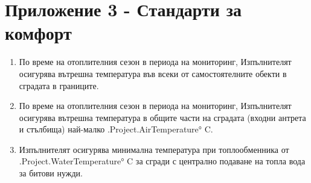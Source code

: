 \section{Приложение 3 {-} Стандарти за комфорт}

\begin{enumerate}[label=\arabic*.]
\item По време на отоплителния сезон в периода на мониторинг,
  Изпълнителят осигурява вътрешна температура във всеки от
  самостоятелните обекти в сградата в границите.

\item По време на отоплителния сезон в периода на мониторинг,
  Изпълнителят осигурява вътрешна температура в общите части на
  сградата (входни антрета и стълбища) най-малко {{.Project.AirTemperature}}° C.

\item Изпълнителят осигурява минимална температура при топлообменника
  от {{.Project.WaterTemperature}}° C за сгради с централно подаване на топла вода за битови
  нужди.
\end{enumerate}
